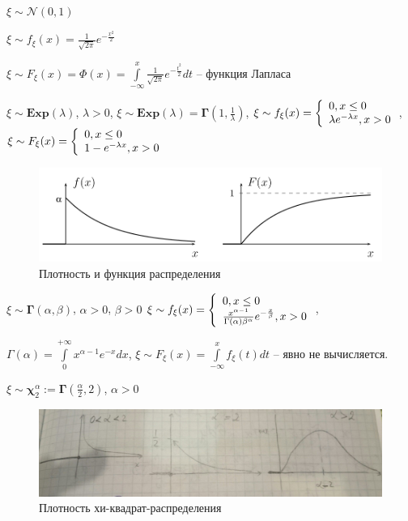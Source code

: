 \begin{defs}
\begin{itemize*}
		$\xi \sim \mathcal{N}(0,1)$

		$\xi \sim f_{\xi}(x) = \frac{1}{\sqrt{2\pi}} e^{-\frac{x^{2}}{2}}$

		$\xi \sim F_{\xi}(x) = \Phi(x) = \int\limits_{-\infty}^{x} \frac{1}{\sqrt{2\pi}} e^{-\frac{t^{2}}{2}} dt$ -- функция Лапласа

		\item {}

		$\xi \sim \boldsymbol{Exp}(\lambda)$, $\lambda > 0$, $\xi \sim \boldsymbol{Exp}(\lambda) = \boldsymbol{\Gamma}(1, \frac{1}{\lambda})$,
		$\xi \sim f_{\xi}(x) = \left\{\begin{array}{l} 	0 , x \leq 0 \\ \lambda e^{-\lambda x}, x > 0 \end{array}\right.$, $\xi \sim F_{\xi}(x) = \left\{\begin{array}{l} 			0 , x \leq 0 \\ 1-e^{-\lambda x}, x > 0 \end{array}\right.$
		\begin{figure}[H]
		      \centering
		      \includegraphics[width=0.8\linewidth]{img/expon.png}
		      \caption{Плотность и функция распределения}
		\end{figure}
		\item {}

		$\xi \sim \boldsymbol{\Gamma}(\alpha, \beta)$, $\alpha > 0$, $\beta > 0$
		$\xi \sim f_{\xi}(x) = \left\{\begin{array}{l} 	0 , x \leq 0 \\
			\frac{x^{\alpha - 1}}{\Gamma(\alpha) \beta^{\alpha}} e^{-\frac{x}{\beta}}, x > 0 \end{array}\right.$,

			$\Gamma(\alpha) = \int\limits_{0}^{+\infty} x^{\alpha -1} e^{-x} dx$, $\xi \sim F_{\xi}(x) = \int\limits_{-\infty}^{x} f_{\xi}(t)dt$ -- явно не вычисляется.
			\item {}

			$\xi \sim \boldsymbol{\chi}_{2}^{\alpha} := \boldsymbol{\Gamma}(\frac{\alpha}{2}, 2)$, $\alpha > 0$
			\begin{figure}[H]
			      \centering
			      \includegraphics[width=0.8\linewidth]{img/chi.png}
			      \caption{Плотность хи-квадрат-распределения}
			\end{figure}
	\end{itemize*}
\end{defs}
\newpage
